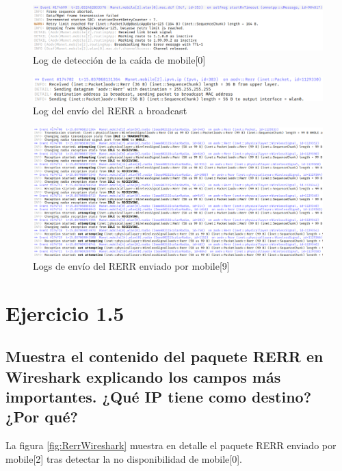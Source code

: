 \begin{figure}[H]
    \centering
    \includegraphics[width=125mm, scale=0.75]{imaxes/aodv/ejercicio4_3.png}
    \caption{Log de detección de la caída de mobile[0]}
    \label{fig:deteccioncaida}
\end{figure}

\begin{figure}[H]
    \centering
    \includegraphics[width=125mm, scale=0.75]{imaxes/aodv/ejercicio4_4.png}
    \caption{Log del envío del RERR a broadcast}
    \label{fig:caidabroadcast}
\end{figure}

\begin{figure}[H]
    \centering
    \includegraphics[width=125mm, scale=0.75]{imaxes/aodv/ejercicio4_5.png}
    \caption{Logs de envío del RERR enviado por mobile[9]}
    \label{fig:transmisioncaida}
\end{figure}

\vspace{1.25cm}
\newpage
\section{Ejercicio 1.5}

\subsection{Muestra el contenido del paquete RERR en Wireshark explicando los campos más importantes. ¿Qué IP
tiene como destino? ¿Por qué?}

La figura \ref{fig:RerrWireshark} muestra en detalle el paquete RERR enviado por mobile[2] tras detectar la no disponibilidad de mobile[0]. 

